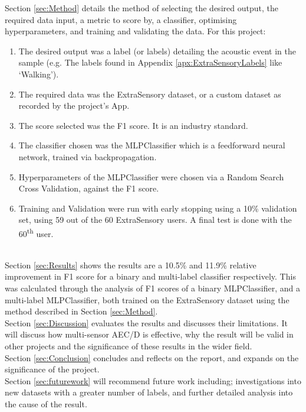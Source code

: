 \documentclass{UoNMCHA}
\newcommand{\sref}[1] {Section \ref{#1}}
\newcommand{\aref}[1] {Appendix \ref{#1}}
\numberwithin{equation}{section}
\begin{document}
\sref{sec:Method} details the method of selecting the desired output, the required data input, a metric to score by, a classifier, optimising hyperparameters, and training and validating the data. For this project:
{\small\begin{enumerate}
    \item The desired output was a label (or labels) detailing the acoustic event in the sample (e.g. The labels found in \aref{apx:ExtraSensoryLabels} like `Walking').
    \item The required data was the ExtraSensory dataset, or a custom dataset as recorded by the project's App.
    \item The score selected was the F1 score. It is an industry standard.
    \item The classifier chosen was the MLPClassifier which is a feedforward neural network, trained via backpropagation.
    \item Hyperparameters of the MLPClassifier were chosen via a Random Search Cross Validation, against the F1 score.
    \item Training and Validation were run with early stopping using a 10\% validation set, using 59 out of the 60 ExtraSensory users. A final test is done with the 60\textsuperscript{th} user.
\end{enumerate} }
~\\
\sref{sec:Results} shows the results are a 10.5\% and 11.9\% relative improvement in F1 score for a binary and multi-label classifier respectively. This was calculated through the analysis of F1 scores of a binary MLPClassifier, and a multi-label MLPClassifier, both trained on the ExtraSensory dataset using the method described in \sref{sec:Method}.\\

\sref{sec:Discussion} evaluates the results and discusses their limitations. It will discuss how multi-sensor AEC/D is effective, why the result will be valid in other projects and the significance of these results in the wider field.\\

\sref{sec:Conclusion} concludes and reflects on the report, and expands on the significance of the project.\\

\sref{sec:futurework} will recommend future work including; investigations into new datasets with a greater number of labels, and further detailed analysis into the cause of the result.

\newpage
\vspace{-2mm}
\end{document}
